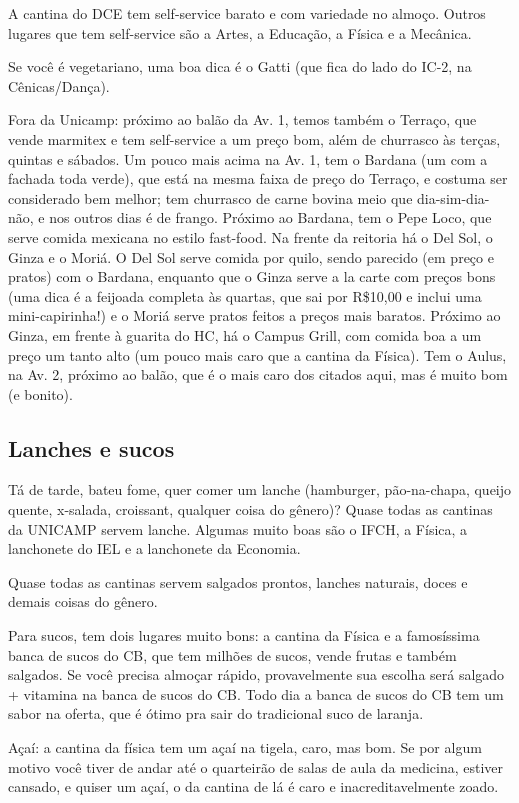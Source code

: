 A cantina do DCE tem self-service barato e com variedade no almoço. Outros
lugares que tem self-service são a Artes, a Educação, a Física e a Mecânica.

Se você é vegetariano, uma boa dica é o Gatti (que fica do lado do IC-2, na
Cênicas/Dança).

Fora da Unicamp: próximo ao balão da Av. 1, temos também o Terraço, que vende
marmitex e tem self-service a um preço bom, além de churrasco às terças, quintas
e sábados. Um pouco mais acima na Av. 1, tem o Bardana (um com a fachada toda
verde), que está na mesma faixa de preço do Terraço, e costuma ser considerado
bem melhor; tem churrasco de carne bovina meio que dia-sim-dia-não, e nos outros
dias é de frango. Próximo ao Bardana, tem o Pepe Loco, que serve comida mexicana
no estilo fast-food. Na frente da reitoria há o Del Sol, o Ginza e o Moriá.
O Del Sol serve comida por quilo, sendo parecido (em preço e pratos) com
o Bardana, enquanto que o Ginza serve a la carte com preços bons (uma dica
é a feijoada completa às quartas, que sai por R\$10,00 e inclui uma
mini-capirinha!) e o Moriá serve pratos feitos a preços mais baratos. Próximo ao
Ginza, em frente à guarita do HC, há o Campus Grill, com comida boa a um preço
um tanto alto (um pouco mais caro que a cantina da Física). Tem o Aulus, na Av.
2, próximo ao balão, que é o mais caro dos citados aqui, mas é muito bom (e
bonito).

\subsection{Lanches e sucos}

Tá de tarde, bateu fome, quer comer um lanche (hamburger, pão-na-chapa, queijo
quente, x-salada, croissant, qualquer coisa do gênero)? Quase todas as cantinas
da UNICAMP servem lanche. Algumas muito boas são o IFCH, a Física, a lanchonete
do IEL e a lanchonete da Economia.

Quase todas as cantinas servem salgados prontos, lanches naturais, doces
e demais coisas do gênero.

Para sucos, tem dois lugares muito bons: a cantina da Física e a famosíssima
banca de sucos do CB, que tem milhões de sucos, vende frutas e também salgados.
Se você precisa almoçar rápido, provavelmente sua escolha será salgado
+ vitamina na banca de sucos do CB. Todo dia a banca de sucos do CB tem um sabor
na oferta, que é ótimo pra sair do tradicional suco de laranja.

Açaí: a cantina da física tem um açaí na tigela, caro, mas bom. Se por algum
motivo você tiver de andar até o quarteirão de salas de aula da medicina,
estiver cansado, e quiser um açaí, o da cantina de lá é caro
e inacreditavelmente zoado.

